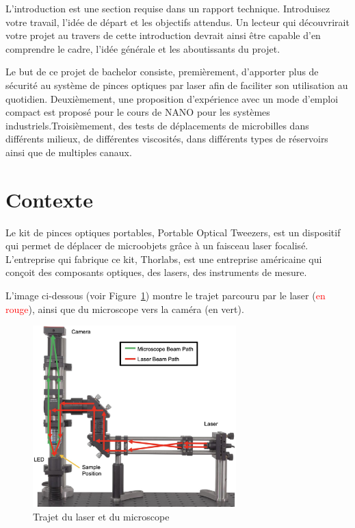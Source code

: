 L'introduction est une section requise dans un rapport technique. Introduisez votre travail, l'idée de départ et les objectifs attendus. Un lecteur qui découvrirait votre projet au travers de cette introduction devrait ainsi être capable d'en comprendre le cadre, l'idée générale et les aboutissants du projet.

Le but de ce projet de bachelor consiste, premièrement, d'apporter plus de sécurité au système de pinces optiques par laser afin de faciliter son utilisation au quotidien. Deuxièmement, une proposition d'expérience avec un mode d'emploi compact est proposé pour le cours de NANO pour les systèmes industriels.Troisièmement, des tests de déplacements de microbilles dans différents milieux, de différentes viscosités, dans différents types de réservoirs ainsi que de multiples canaux.
\newpage
\section{Contexte}

Le kit de pinces optiques portables, Portable Optical Tweezers, est un dispositif qui permet de déplacer de microobjets grâce à un faisceau laser focalisé. L'entreprise qui fabrique ce kit, Thorlabs, est une entreprise américaine qui conçoit des composants optiques, des lasers, des instruments de mesure.

L'image ci-dessous (voir Figure~\ref{chemin_laser_caméra}) montre le trajet parcouru par le laser (\textcolor{red}{en rouge}), ainsi que du microscope vers la caméra (\textcolor[RGB]{0, 120, 0}{en vert}).

\begin{figure}[H]
    \begin{center}
        \includegraphics[width=0.7\textwidth]{assets/figures/Introduction/chemin_laser_camera.jpeg}
    \end{center}
    \caption{Trajet du laser et du microscope}
    \label{chemin_laser_caméra}
\end{figure}

